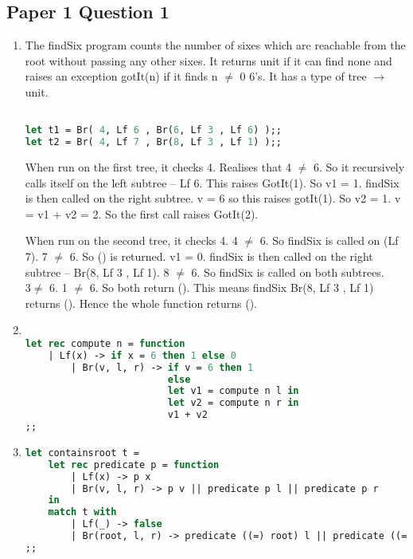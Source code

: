 \documentclass[10pt,\jkfside,a4paper]{article}
\begin{document}
\subsection*{Paper 1 Question 1}

\begin{enumerate}[label=(\alph*)]

\item The findSix program counts the number of sixes which are reachable from the root 
without passing any other sixes. It returns unit if it can find none and raises an exception 
gotIt(n) if it finds n $\neq$ 0 6's. It has a type of tree $\rightarrow$ unit. 

\begin{lstlisting}[language=Caml]

let t1 = Br( 4, Lf 6 , Br(6, Lf 3 , Lf 6) );;
let t2 = Br( 4, Lf 7 , Br(8, Lf 3 , Lf 1) );;

\end{lstlisting}

When run on the first tree, it checks 4. Realises that 4 $\neq$ 6. So it recursively calls itself on 
the left subtree -- Lf 6. This raises GotIt(1). So v1 = 1. findSix is then called on the right subtree. 
v = 6 so this raises gotIt(1). So v2 = 1. v = v1 + v2 = 2. So the first call raises GotIt(2).

When run on the second tree, it checks 4. 4 $\neq$ 6. So findSix is called on (Lf 7). 7 $\neq$ 6. 
So () is returned. v1 = 0. findSix is then called on the right subtree -- Br(8, Lf 3 , Lf 1).
8 $\neq$ 6. So findSix is called on both subtrees. $3 \neq$ 6. 1 $\neq$ 6. So both return (). This means 
findSix Br(8, Lf 3 , Lf 1) returns (). Hence the whole function returns ().

\item 

\begin{lstlisting}[language=Caml]

let rec compute n = function
	| Lf(x) -> if x = 6 then 1 else 0
        | Br(v, l, r) -> if v = 6 then 1
                         else
                         let v1 = compute n l in
                         let v2 = compute n r in
                         v1 + v2
;;
\end{lstlisting}

\item 

\begin{lstlisting}[language=Caml]
let containsroot t =
    let rec predicate p = function
        | Lf(x) -> p x
        | Br(v, l, r) -> p v || predicate p l || predicate p r
    in
    match t with
        | Lf(_) -> false
        | Br(root, l, r) -> predicate ((=) root) l || predicate ((=) root) r
;;
\end{lstlisting}


\end{enumerate}
\end{document}
